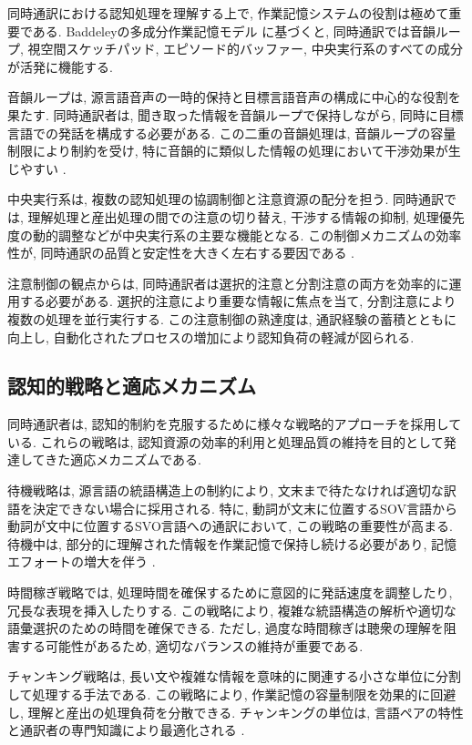 同時通訳における認知処理を理解する上で, 作業記憶システムの役割は極めて重要である.
Baddeleyの多成分作業記憶モデル \cite{baddeley2000episodic} に基づくと, 同時通訳では音韻ループ, 視空間スケッチパッド, エピソード的バッファー, 中央実行系のすべての成分が活発に機能する.

音韻ループは, 源言語音声の一時的保持と目標言語音声の構成に中心的な役割を果たす.
同時通訳者は, 聞き取った情報を音韻ループで保持しながら, 同時に目標言語での発話を構成する必要がある.
この二重の音韻処理は, 音韻ループの容量制限により制約を受け, 特に音韻的に類似した情報の処理において干渉効果が生じやすい \cite{christoffels2006cognitive}.

中央実行系は, 複数の認知処理の協調制御と注意資源の配分を担う.
同時通訳では, 理解処理と産出処理の間での注意の切り替え, 干渉する情報の抑制, 処理優先度の動的調整などが中央実行系の主要な機能となる.
この制御メカニズムの効率性が, 同時通訳の品質と安定性を大きく左右する要因である \cite{mizuno2005process}.

注意制御の観点からは, 同時通訳者は選択的注意と分割注意の両方を効率的に運用する必要がある.
選択的注意により重要な情報に焦点を当て, 分割注意により複数の処理を並行実行する.
この注意制御の熟達度は, 通訳経験の蓄積とともに向上し, 自動化されたプロセスの増加により認知負荷の軽減が図られる.

\subsection{認知的戦略と適応メカニズム}

同時通訳者は, 認知的制約を克服するために様々な戦略的アプローチを採用している.
これらの戦略は, 認知資源の効率的利用と処理品質の維持を目的として発達してきた適応メカニズムである.

待機戦略は, 源言語の統語構造上の制約により, 文末まで待たなければ適切な訳語を決定できない場合に採用される.
特に, 動詞が文末に位置するSOV言語から動詞が文中に位置するSVO言語への通訳において, この戦略の重要性が高まる.
待機中は, 部分的に理解された情報を作業記憶で保持し続ける必要があり, 記憶エフォートの増大を伴う \cite{gile1995basic}.

時間稼ぎ戦略では, 処理時間を確保するために意図的に発話速度を調整したり, 冗長な表現を挿入したりする.
この戦略により, 複雑な統語構造の解析や適切な語彙選択のための時間を確保できる.
ただし, 過度な時間稼ぎは聴衆の理解を阻害する可能性があるため, 適切なバランスの維持が重要である.

チャンキング戦略は, 長い文や複雑な情報を意味的に関連する小さな単位に分割して処理する手法である.
この戦略により, 作業記憶の容量制限を効果的に回避し, 理解と産出の処理負荷を分散できる.
チャンキングの単位は, 言語ペアの特性と通訳者の専門知識により最適化される \cite{darò1994memory}.

